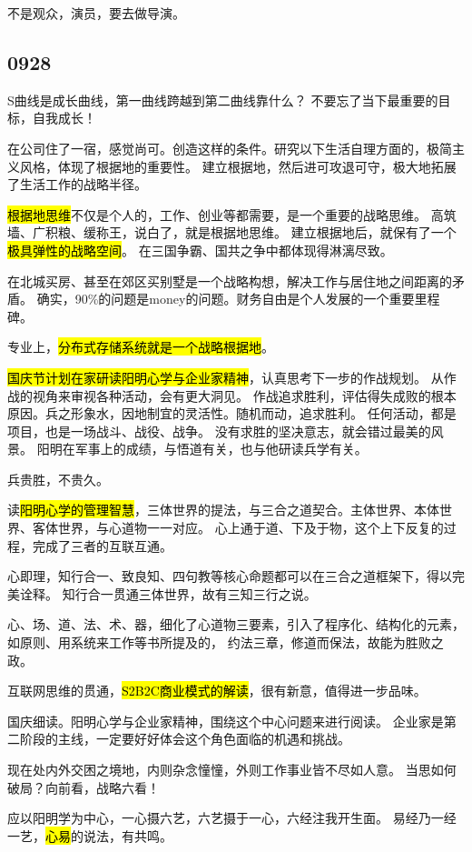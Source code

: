 不是观众，演员，要去做导演。

\subsection{0928}

S曲线是成长曲线，第一曲线跨越到第二曲线靠什么？ 不要忘了当下最重要的目标，自我成长！

在公司住了一宿，感觉尚可。创造这样的条件。研究以下生活自理方面的，极简主义风格，体现了根据地的重要性。
建立根据地，然后进可攻退可守，极大地拓展了生活工作的战略半径。

\hl{根据地思维}不仅是个人的，工作、创业等都需要，是一个重要的战略思维。
高筑墙、广积粮、缓称王，说白了，就是根据地思维。
建立根据地后，就保有了一个\hl{极具弹性的战略空间}。
在三国争霸、国共之争中都体现得淋漓尽致。

在北城买房、甚至在郊区买别墅是一个战略构想，解决工作与居住地之间距离的矛盾。
确实，90\%的问题是money的问题。财务自由是个人发展的一个重要里程碑。

专业上，\hl{分布式存储系统就是一个战略根据地}。

\hl{国庆节计划在家研读阳明心学与企业家精神}，认真思考下一步的作战规划。
从作战的视角来审视各种活动，会有更大洞见。
作战追求胜利，评估得失成败的根本原因。兵之形象水，因地制宜的灵活性。随机而动，追求胜利。
任何活动，都是项目，也是一场战斗、战役、战争。
没有求胜的坚决意志，就会错过最美的风景。
阳明在军事上的成绩，与悟道有关，也与他研读兵学有关。

兵贵胜，不贵久。

读\hl{阳明心学的管理智慧}，三体世界的提法，与三合之道契合。主体世界、本体世界、客体世界，与心道物一一对应。
心上通于道、下及于物，这个上下反复的过程，完成了三者的互联互通。

心即理，知行合一、致良知、四句教等核心命题都可以在三合之道框架下，得以完美诠释。
知行合一贯通三体世界，故有三知三行之说。

心、场、道、法、术、器，细化了心道物三要素，引入了程序化、结构化的元素，如原则、用系统来工作等书所提及的，
约法三章，修道而保法，故能为胜败之政。

互联网思维的贯通，\hl{S2B2C商业模式的解读}，很有新意，值得进一步品味。

国庆细读。阳明心学与企业家精神，围绕这个中心问题来进行阅读。
企业家是第二阶段的主线，一定要好好体会这个角色面临的机遇和挑战。

现在处内外交困之境地，内则杂念憧憧，外则工作事业皆不尽如人意。
当思如何破局？向前看，战略六看！

应以阳明学为中心，一心摄六艺，六艺摄于一心，六经注我开生面。
易经乃一经一艺，\hl{心易}的说法，有共鸣。

